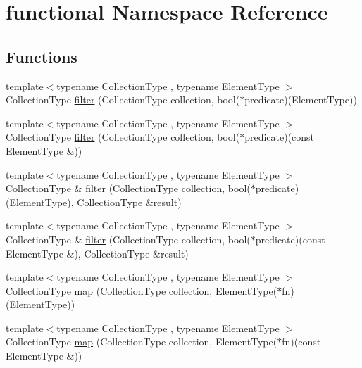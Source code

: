 \hypertarget{namespacefunctional}{}\section{functional Namespace Reference}
\label{namespacefunctional}
\subsection*{Functions}
\begin{DoxyCompactItemize}
\item 
{\footnotesize template$<$typename Collection\+Type , typename Element\+Type $>$ }\\Collection\+Type \mbox{\hyperlink{namespacefunctional_a18cb8a9ea2f81ed7b9697cac15b03453}{filter}} (Collection\+Type collection, bool($\ast$predicate)(Element\+Type))
\item 
{\footnotesize template$<$typename Collection\+Type , typename Element\+Type $>$ }\\Collection\+Type \mbox{\hyperlink{namespacefunctional_a90c12ee7295b32ccf6bbffa3e71ae37b}{filter}} (Collection\+Type collection, bool($\ast$predicate)(const Element\+Type \&))
\item 
{\footnotesize template$<$typename Collection\+Type , typename Element\+Type $>$ }\\Collection\+Type \& \mbox{\hyperlink{namespacefunctional_a58614b761fe14f3d495a1ab30281650e}{filter}} (Collection\+Type collection, bool($\ast$predicate)(Element\+Type), Collection\+Type \&result)
\item 
{\footnotesize template$<$typename Collection\+Type , typename Element\+Type $>$ }\\Collection\+Type \& \mbox{\hyperlink{namespacefunctional_a594945f3d85ae414fe97ff74fe8f37cf}{filter}} (Collection\+Type collection, bool($\ast$predicate)(const Element\+Type \&), Collection\+Type \&result)
\item 
{\footnotesize template$<$typename Collection\+Type , typename Element\+Type $>$ }\\Collection\+Type \mbox{\hyperlink{namespacefunctional_ab335718655fa5514cec86fba6ff9d17b}{map}} (Collection\+Type collection, Element\+Type($\ast$fn)(Element\+Type))
\item 
{\footnotesize template$<$typename Collection\+Type , typename Element\+Type $>$ }\\Collection\+Type \mbox{\hyperlink{namespacefunctional_ad8c726e74a75223fe88a00c22fc8142b}{map}} (Collection\+Type collection, Element\+Type($\ast$fn)(const Element\+Type \&))

\end{DoxyCompactItemize}
